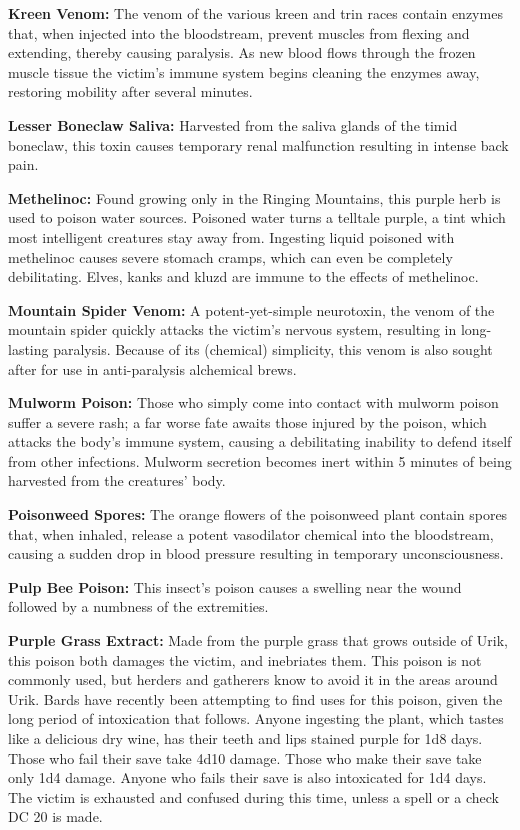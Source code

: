 \textbf{Kreen Venom:} The venom of the various kreen and trin races contain enzymes that, when injected into the bloodstream, prevent muscles from flexing and extending, thereby causing paralysis. As new blood flows through the frozen muscle tissue the victim's immune system begins cleaning the enzymes away, restoring mobility after several minutes.

\textbf{Lesser Boneclaw Saliva:} Harvested from the saliva glands of the timid boneclaw, this toxin causes temporary renal malfunction resulting in intense back pain.

\textbf{Methelinoc:} Found growing only in the Ringing Mountains, this purple herb is used to poison water sources. Poisoned water turns a telltale purple, a tint which most intelligent creatures stay away from. Ingesting liquid poisoned with methelinoc causes severe stomach cramps, which can even be completely debilitating. Elves, kanks and kluzd are immune to the effects of methelinoc.

\textbf{Mountain Spider Venom:} A potent-yet-simple neurotoxin, the venom of the mountain spider quickly attacks the victim's nervous system, resulting in long-lasting paralysis. Because of its (chemical) simplicity, this venom is also sought after for use in anti-paralysis alchemical brews.

\textbf{Mulworm Poison:} Those who simply come into contact with mulworm poison suffer a severe rash; a far worse fate awaits those injured by the poison, which attacks the body's immune system, causing a debilitating inability to defend itself from other infections. Mulworm secretion becomes inert within 5 minutes of being harvested from the creatures' body.

\textbf{Poisonweed Spores:} The orange flowers of the poisonweed plant contain spores that, when inhaled, release a potent vasodilator chemical into the bloodstream, causing a sudden drop in blood pressure resulting in temporary unconsciousness.

\textbf{Pulp Bee Poison:} This insect's poison causes a swelling near the wound followed by a numbness of the extremities.

\textbf{Purple Grass Extract:} Made from the purple grass that grows outside of Urik, this poison both damages the victim, and inebriates them. This poison is not commonly used, but herders and gatherers know to avoid it in the areas around Urik. Bards have recently been attempting to find uses for this poison, given the long period of intoxication that follows. Anyone ingesting the plant, which tastes like a delicious dry wine, has their teeth and lips stained purple for 1d8 days. Those who fail their save take 4d10 damage. Those who make their save take only 1d4 damage. Anyone who fails their save is also intoxicated for 1d4 days. The victim is exhausted and confused during this time, unless a  spell or a  check DC 20 is made.


